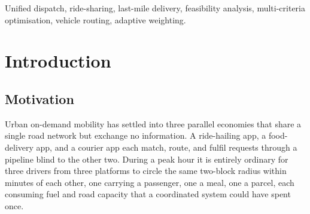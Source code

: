 \documentclass[conference]{IEEEtran}
\begin{document}
\begin{abstract}
Passenger transport, food delivery, and parcel courier services operate as
three disjoint dispatch systems over one shared road network, so a driver is
routinely sent past an unserved request that a slightly different trip could
have absorbed. This paper presents a Dynamic Feasibility Intelligence
Framework (DFIF) that reverses the conventional ordering of dispatch: instead
of routing requests and filtering infeasible groupings afterwards, it scores
the pairwise compatibility of pending passenger, food, and parcel requests
along five dimensions---pickup proximity, route similarity, time-window
overlap, capacity fit, and priority---and admits only batches clearing a
threshold before any route is computed. We give the compatibility function a
formal treatment, proving boundedness, a Lipschitz sensitivity bound that
predicts a service-type-dependent asymmetry in delay improvement, and a
worst-case suboptimality bound guaranteeing that feasibility-first batching
never underperforms independent dispatch. The five weights are then made
trainable through a softmax-parameterised gradient rule driven by realised
batch outcomes. Evaluation uses 36 seeded runs across request pools of 50 to
500 over a 60-vehicle heterogeneous fleet. Against independent single-service
dispatch, DFIF cuts vehicle trips per request by 37--40\% on pools the fleet
can fully serve, and raises vehicle utilisation from roughly 57\% to
73--76\%. A seed-matched ablation
($n=18$ pairs) isolates the contribution of the adaptive layer: it improves
CO\textsubscript{2} reduction by 2.84 percentage points ($p=0.0004$) and
utilisation by 6.10 points at the largest pool ($p<0.05$), at a measured cost
of 5.4~ms additional processing per request.
\end{abstract}

\begin{IEEEkeywords}
Unified dispatch, ride-sharing, last-mile delivery, feasibility analysis,
multi-criteria optimisation, vehicle routing, adaptive weighting.
\end{IEEEkeywords}

\section{Introduction}

\subsection{Motivation}
Urban on-demand mobility has settled into three parallel economies that share
a single road network but exchange no information. A ride-hailing app, a
food-delivery app, and a courier app each match, route, and fulfil requests
through a pipeline blind to the other two. During a peak hour it is entirely
ordinary for three drivers from three platforms to circle the same two-block
radius within minutes of each other, one carrying a passenger, one a meal,
one a parcel, each consuming fuel and road capacity that a coordinated system
could have spent once.
\end{document}
